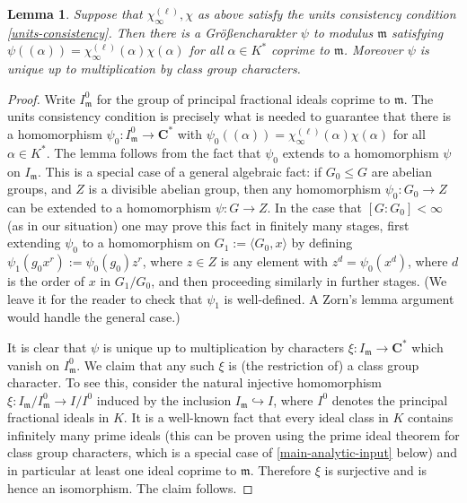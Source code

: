 \documentclass[11pt,reqno]{amsart}
\numberwithin{equation}{section}
\newtheorem{lemma}[theorem]{Lemma}
\theoremstyle{definition}
\theoremstyle{remark}
\newcommand{\mf}{\mathfrak}
\renewcommand{\le}{\leqslant}
\newcommand\C{\mathbf{C}}
\begin{document}
\begin{lemma}\label{hecke-lift}
Suppose that $\chi^{(\ell)}_{\infty}, \chi$ as above satisfy the units consistency condition \cref{units-consistency}.  Then there is a Gr\"o{\ss}encharakter $\psi$ to modulus $\mf{m}$ satisfying $\psi((\alpha)) = \chi^{(\ell)}_{\infty}(\alpha) \chi(\alpha)$ for all $\alpha \in K^*$ coprime to $\mf{m}$. Moreover $\psi$ is unique up to multiplication by class group characters.
\end{lemma}
\begin{proof}
Write $I^0_{\mf{m}}$ for the group of principal fractional ideals coprime to $\mf{m}$.
The units consistency condition is precisely what is needed to guarantee that there is a homomorphism $\psi_0 : I^0_{\mf{m}} \rightarrow \C^*$ with $\psi_0((\alpha)) = \chi^{(\ell)}_{\infty}(\alpha) \chi(\alpha)$ for all $\alpha \in K^*$. The lemma follows from the fact that $\psi_0$ extends to a homomorphism $\psi$ on $I_{\mf{m}}$. This is a special case of a general algebraic fact: if $G_0 \le G$ are abelian groups, and $Z$ is a divisible abelian group, then any homomorphism $\psi_0 : G_0 \rightarrow Z$ can be extended to a homomorphism $\psi : G \rightarrow Z$. In the case that $[G : G_0] < \infty$ (as in our situation) one may prove this fact in finitely many stages, first extending $\psi_0$ to a homomorphism on $G_1 := \langle G_0, x\rangle$ by defining $\psi_1 (g_0 x^r) := \psi_0(g_0) z^r$, where $z \in Z$ is any element with $z^d = \psi_0(x^d)$, where $d$ is the order of $x$ in $G_1/G_0$, and then proceeding similarly in further stages. (We leave it for the reader to check that $\psi_1$ is well-defined. A Zorn's lemma argument would handle the general case.) 

It is clear that $\psi$ is unique up to multiplication by characters $\xi : I_{\mf{m}} \rightarrow \C^*$ which vanish on $I_{\mf{m}}^0$. We claim that any such $\xi$ is (the restriction of) a class group character. To see this, consider the natural injective homomorphism $\xi : I_{\mf{m}}/I_{\mf{m}}^0 \rightarrow I/I^0$ induced by the inclusion $I_{\mf{m}} \hookrightarrow I$, where $I^0$ denotes the principal fractional ideals in $K$. It is a well-known fact that every ideal class in $K$ contains infinitely many prime ideals (this can be proven using the prime ideal theorem for class group characters, which is a special case of \cref{main-analytic-input} below) and in particular at least one ideal coprime to $\mf{m}$. Therefore $\xi$ is surjective and is hence an isomorphism. The claim follows.
\end{proof}
\end{document}
